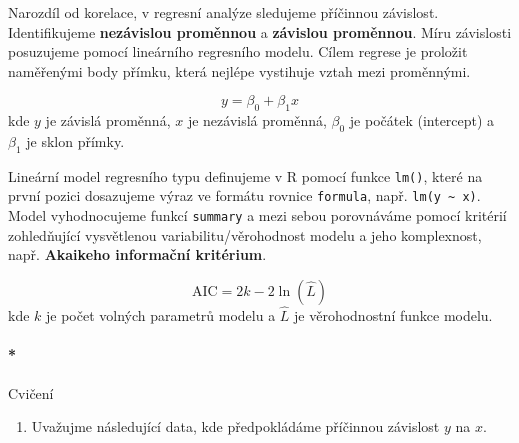 \documentclass[
  letterpaper,
  DIV=11,
  numbers=noendperiod]{scrreprt}
\let\oldparagraph\paragraph
\renewcommand{\paragraph}[1]{\oldparagraph{#1}\mbox{}}
\providecommand{\tightlist}{%
  \setlength{\itemsep}{0pt}\setlength{\parskip}{0pt}}\usepackage{longtable,booktabs,array}
\begin{document}
Narozdíl od korelace, v regresní analýze sledujeme příčinnou závislost.
Identifikujeme \textbf{nezávislou proměnnou} a \textbf{závislou
proměnnou}. Míru závislosti posuzujeme pomocí lineárního regresního
modelu. Cílem regrese je proložit naměřenými body přímku, která nejlépe
vystihuje vztah mezi proměnnými.

\[
y = \beta_0 + \beta_1x
\] kde \(y\) je závislá proměnná, \(x\) je nezávislá proměnná,
\(\beta_0\) je počátek (intercept) a \(\beta_1\) je sklon přímky.

Lineární model regresního typu definujeme v R pomocí funkce
\texttt{lm()}, které na první pozici dosazujeme výraz ve formátu rovnice
\texttt{formula}, např. \texttt{lm(y\ \textasciitilde{}\ x)}. Model
vyhodnocujeme funkcí \texttt{summary} a mezi sebou porovnáváme pomocí
kritérií zohledňující vysvětlenou variabilitu/věrohodnost modelu a jeho
komplexnost, např. \textbf{Akaikeho informační kritérium}.

\[
\text{AIC} = 2k - 2\ln(\hat{L})
\] kde \(k\) je počet volných parametrů modelu a \(\hat{L}\) je
věrohodnostní funkce modelu.

\hypertarget{cviux10denuxed-11}{%
\paragraph*{Cvičení}\label{cviux10denuxed-11}}

\begin{enumerate}
\def\labelenumi{\arabic{enumi}.}
\tightlist
\item
  Uvažujme následující data, kde předpokládáme příčinnou závislost \(y\)
  na \(x\).
\end{enumerate}
\end{document}
